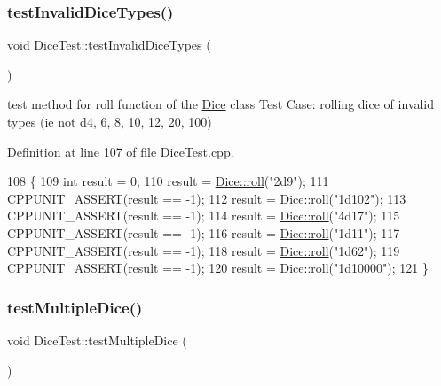 \subsubsection{\texorpdfstring{test\+Invalid\+Dice\+Types()}{testInvalidDiceTypes()}}
{\footnotesize\ttfamily void Dice\+Test\+::test\+Invalid\+Dice\+Types (\begin{DoxyParamCaption}{ }\end{DoxyParamCaption})\hspace{0.3cm}{\ttfamily [protected]}}

test method for roll function of the \hyperlink{class_dice}{Dice} class Test Case\+: rolling dice of invalid types (ie not d4, 6, 8, 10, 12, 20, 100) 

Definition at line 107 of file Dice\+Test.\+cpp.


\begin{DoxyCode}
108 \{
109     \textcolor{keywordtype}{int} result = 0;
110     result = \hyperlink{class_dice_a4923bdf22040579e6e071e1e987916c2}{Dice::roll}(\textcolor{stringliteral}{"2d9"});
111     CPPUNIT\_ASSERT(result == -1);
112     result = \hyperlink{class_dice_a4923bdf22040579e6e071e1e987916c2}{Dice::roll}(\textcolor{stringliteral}{"1d102"});
113     CPPUNIT\_ASSERT(result == -1);
114     result = \hyperlink{class_dice_a4923bdf22040579e6e071e1e987916c2}{Dice::roll}(\textcolor{stringliteral}{"4d17"});
115     CPPUNIT\_ASSERT(result == -1);
116     result = \hyperlink{class_dice_a4923bdf22040579e6e071e1e987916c2}{Dice::roll}(\textcolor{stringliteral}{"1d11"});
117     CPPUNIT\_ASSERT(result == -1);
118     result = \hyperlink{class_dice_a4923bdf22040579e6e071e1e987916c2}{Dice::roll}(\textcolor{stringliteral}{"1d62"});
119     CPPUNIT\_ASSERT(result == -1);
120     result = \hyperlink{class_dice_a4923bdf22040579e6e071e1e987916c2}{Dice::roll}(\textcolor{stringliteral}{"1d10000"});
121 \}
\end{DoxyCode}
\hypertarget{class_dice_test_a849ab553a12a5a5d4deec59ddd1edf30}{}\label{class_dice_test_a849ab553a12a5a5d4deec59ddd1edf30} 
\subsubsection{\texorpdfstring{test\+Multiple\+Dice()}{testMultipleDice()}}
{\footnotesize\ttfamily void Dice\+Test\+::test\+Multiple\+Dice (\begin{DoxyParamCaption}{ }\end{DoxyParamCaption})\hspace{0.3cm}{\ttfamily [protected]}}

